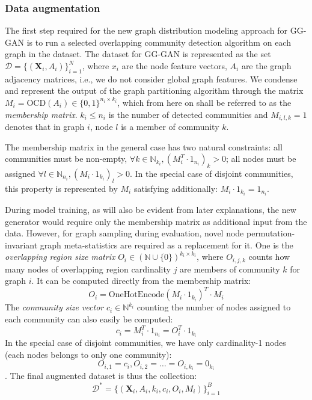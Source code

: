 \subsubsection{Data augmentation}
The first step required for the new graph distribution modeling approach for GG-GAN is to run a selected overlapping community detection algorithm on each graph in the dataset. The dataset for GG-GAN is represented as the set $\mathcal{D} = \{(\mathbf{X}_i, A_i)\}_{i=1}^{N}$, where $x_i$ are the node feature vectors, $A_i$ are the graph adjacency matrices, i.e., we do not consider global graph features. We condense and represent the output of the graph partitioning algorithm through the matrix $M_i = \text{OCD}(A_i) \in \{0, 1\}^{n_i \times k_i}$, which from here on shall be referred to as the \emph{membership matrix}. $k_i \leq n_i$ is the number of detected communities and $M_{i,l,k}=1$ denotes that in graph $i$, node $l$ is a member of community $k$.

The membership matrix in the general case has two natural constraints: all communities must be non-empty, $\forall k \in \mathbb{N}_{k_i}, (M^T_i \cdot 1_{n_i})_k > 0$; all nodes must be assigned $\forall l \in \mathbb{N}_{n_i}, (M_i \cdot 1_{k_i})_l > 0$. In the special case of disjoint communities, this property is represented by $M_i$ satisfying additionally: $M_i \cdot 1_{k_i} = 1_{n_i}$.

During model training, as will also be evident from later explanations, the new generator would require only the membership matrix as additional input from the data. However, for graph sampling during evaluation, novel node permutation-invariant graph meta-statistics are required as a replacement for it. One is the \emph{overlapping region size matrix} $O_i \in (\mathbb{N}\cup\{0\})^{k_i \times k_i}$, where $O_{i,j,k}$ counts how many nodes of overlapping region cardinality $j$ are members of community $k$ for graph $i$. It can be computed directly from the membership matrix:
$$O_i = \text{OneHotEncode}(M_i \cdot 1_{k_i})^T \cdot M_i$$
The \emph{community size vector} $c_i \in \mathbb{N}^{k_i}$ counting the number of nodes assigned to each community can also easily be computed: $$c_i = M^T_i \cdot 1_{n_i} = O_i^T \cdot 1_{k_i}$$
In the special case of disjoint communities, we have only cardinality-1 nodes (each nodes belongs to only one community): $$O_{i,1}=c_i, O_{i,2}=\dots=O_{i,k_i}=0_{k_i}$$.
The final augmented dataset is thus the collection: $$\mathcal{D}^* = \{(\mathbf{X}_i, A_i, k_i, c_i, O_i, M_i)\}_{i=1}^{B}$$

